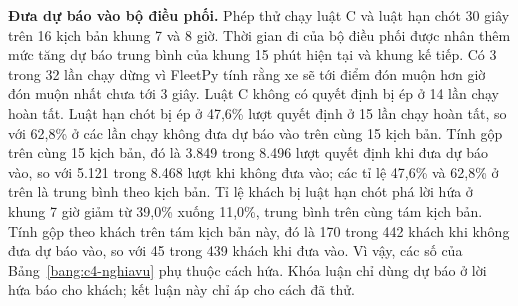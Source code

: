 \textbf{Đưa dự báo vào bộ điều phối.} Phép thử chạy luật C và luật hạn chót 30 giây trên 16 kịch bản khung 7 và 8 giờ.
Thời gian đi của bộ điều phối được nhân thêm mức tăng dự báo trung bình của khung 15 phút hiện tại và khung kế tiếp. Có
3 trong 32 lần chạy dừng vì FleetPy tính rằng xe sẽ tới điểm đón muộn hơn giờ đón muộn nhất chưa tới 3 giây. Luật C
không có quyết định bị ép ở 14 lần chạy hoàn tất. Luật hạn chót bị ép ở 47,6\% lượt quyết định ở 15 lần chạy hoàn tất,
so với 62,8\% ở các lần chạy không đưa dự báo vào trên cùng 15 kịch bản. Tính gộp trên cùng 15 kịch bản, đó là 3.849
trong 8.496 lượt quyết định khi đưa dự báo vào, so với 5.121 trong 8.468 lượt khi không đưa vào; các tỉ lệ 47,6\% và
62,8\% ở trên là trung bình theo kịch bản. Tỉ lệ khách bị luật hạn chót phá lời hứa ở khung 7 giờ giảm từ 39,0\% xuống
11,0\%, trung bình trên cùng tám kịch bản. Tính gộp theo khách trên tám kịch bản này, đó là 170 trong 442 khách khi
không đưa dự báo vào, so với 45 trong 439 khách khi đưa vào. Vì vậy, các số của Bảng~\ref{bang:c4-nghiavu} phụ thuộc cách
hứa. Khóa luận chỉ dùng dự báo ở lời hứa báo cho khách; kết luận này chỉ áp cho cách đã thử.

